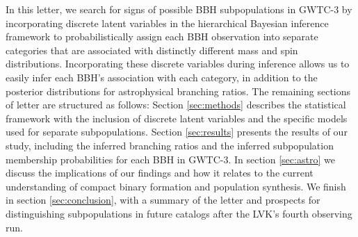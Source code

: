In this letter, we search for signs of possible BBH subpopulations in GWTC-3 by incorporating discrete latent variables in the hierarchical Bayesian inference framework to probabilistically assign each BBH observation into separate categories that are associated with distinctly different mass and spin distributions. Incorporating these discrete variables during inference allows us to easily infer each BBH's association with each category, in addition to the posterior distributions for astrophysical branching ratios. The remaining sections of letter are structured as follows: Section \ref{sec:methods} describes the statistical framework with the inclusion of discrete latent variables and the specific models used for separate subpopulations. Section \ref{sec:results} presents the results of our study, including the inferred branching ratios and the inferred subpopulation membership probabilities for each BBH in GWTC-3. In section \ref{sec:astro} we discuss the implications of our findings and how it relates to the current understanding of compact binary formation and population synthesis. We finish in section \ref{sec:conclusion}, with a summary of the letter and prospects for distinguishing subpopulations in future catalogs after the LVK's fourth observing run. 
